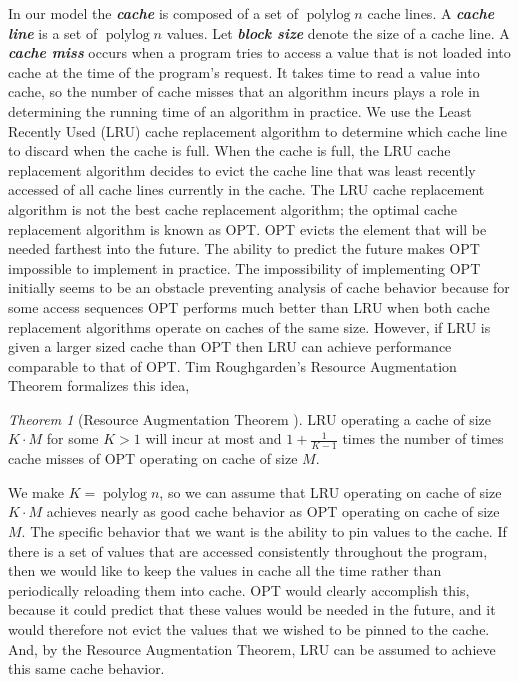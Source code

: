 \documentclass[sigconf]{acmart}
\newcommand{\defn}[1]       {{\textit{\textbf{\boldmath #1}}}}
\renewcommand{\paragraph}[1]{\vspace{0.09in}\noindent{\bf \boldmath #1.}}
\theoremstyle{remark}
\newtheorem{theorem}{Theorem}[section]
\theoremstyle{remark}
\begin{document}
\paragraph{Cache Behavior Preliminaries}
In our model the \defn{cache} is composed of a set of $\operatorname{polylog}{n}$ cache lines.
A \defn{cache line} is a set of $\operatorname{polylog}{n}$ values.
Let \defn{block size} denote the size of a cache line.
A \defn{cache miss} occurs when a program tries to access a value that is not loaded into cache at the time of the program's request.
It takes time to read a value into cache, so the number of cache misses that an algorithm incurs plays a role in determining the running time of an algorithm in practice. 
We use the Least Recently Used (LRU) cache replacement algorithm to determine which cache line to discard when the cache is full. 
When the cache is full, the LRU cache replacement algorithm decides to evict the cache line that was least recently accessed of all cache lines currently in the cache. 
The LRU cache replacement algorithm is not the best cache replacement algorithm; the optimal cache replacement algorithm is known as OPT. 
OPT evicts the element that will be needed farthest into the future.
The ability to predict the future makes OPT impossible to implement in practice.
The impossibility of implementing OPT initially seems to be an obstacle preventing analysis of cache behavior because for some access sequences OPT performs much better than LRU when both cache replacement algorithms operate on caches of the same size. 
However, if LRU is given a larger sized cache than OPT then LRU can  achieve performance comparable to that of OPT. 
Tim Roughgarden's Resource Augmentation Theorem formalizes this idea,
\begin{theorem}[Resource Augmentation Theorem \cite{http://timroughgarden.org/f14/l/l3.pdf}]
	LRU operating a cache of size $K\cdot M$ for some $K>1$ will incur at most and $1+\frac{1}{K-1}$ times the number of times cache misses of OPT operating on cache of size $M$.
\end{theorem}
We make $K=\operatorname{polylog}{n}$, so we can assume that LRU operating on cache of size $K\cdot M$ achieves nearly as good cache behavior as OPT operating on cache of size $M$.
The specific behavior that we want is the ability to pin values to the cache.
If there is a set of values that are accessed consistently throughout the program, then we would like to keep the values in cache all the time rather than periodically reloading them into cache.
OPT would clearly accomplish this, because it could predict that these values would be needed in the future, and it would therefore not evict the values that we wished to be pinned to the cache.
And, by the Resource Augmentation Theorem, LRU can be assumed to achieve this same cache behavior.
\end{document}

